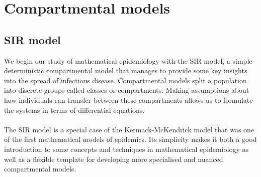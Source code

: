 \chapter{Compartmental models}\label{ch:compartments}
\section{SIR model}
We begin our study of mathematical epidemiology with the SIR model, a simple deterministic compartmental model that manages to provide some key insights into the spread of infectious disease. Compartmental models split a population into discrete groups called classes or compartments. Making assumptions about how individuals can transfer between these compartments allows us to formulate the systems in terms of differential equations\cite{models-epidemiology}.\\
\\
The SIR model is a special case of the Kermack-McKendrick model that was one of the first mathematical models of epidemics\cite{kermack-mckendrick}. Its simplicity makes it both a good introduction to some concepts and techniques in mathematical epidemiology as well as a flexible template for developing more specialised and nuanced compartmental models.
